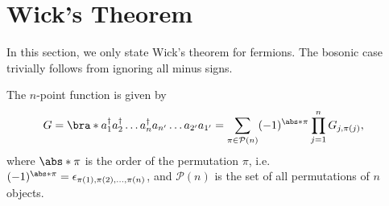 \documentclass[english, parskip=full]{scrartcl}
\begin{document}
\section{Wick's Theorem}
In this section, we only state Wick's theorem for fermions.
The bosonic case trivially follows from ignoring all minus signs.

The $n$-point function is given by
\begin{align}
G &= \bra*{a_1^\dagger a_2^\dagger \dots a_n^\dagger a_{n'} \dots a_{2'} a_{1'}} = \sum_{\pi\in \mathcal{P}(n)} (-1)^{\abs*{\pi}} \prod_{j=1}^n G_{j, \pi(j)},
\end{align}
where $\abs*{\pi}$ is the order of the permutation $\pi$, i.e. $(-1)^{\abs*{\pi}} = \epsilon_{\pi(1),\pi(2),\dots,\pi(n)}$, and $\mathcal{P}(n)$ is the set of all permutations of $n$ objects.
\end{document}
